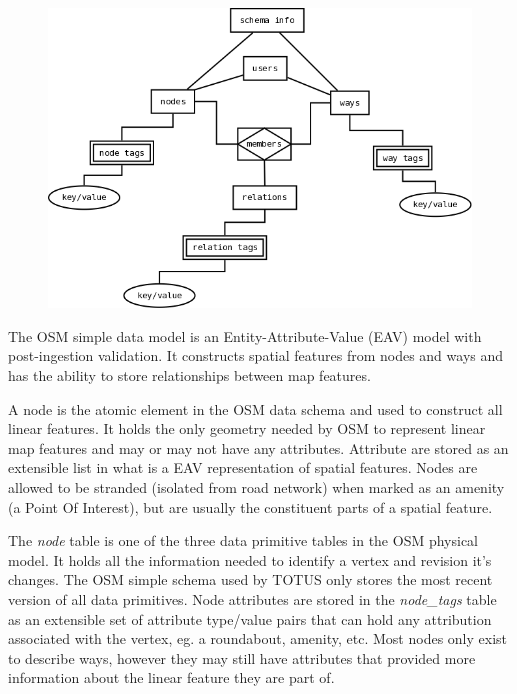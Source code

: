 \begin{figure}[h]
 \centering
 \includegraphics[scale=0.4,keepaspectratio=true]{./osm.png}
\end{figure}


The OSM simple data model is an Entity-Attribute-Value (EAV) model with
post-ingestion validation. It constructs spatial features from nodes
and ways and has the ability to store relationships between map
features.

A node is the atomic element in the OSM data schema and used to
construct all linear features. It holds the only geometry needed by OSM
to represent linear map features and may or may not have any
attributes. Attribute are stored as an extensible list in what is a EAV
representation of spatial features. Nodes are allowed to be stranded
(isolated from road network) when marked as an amenity (a Point Of
Interest), but are usually the constituent parts of a spatial feature.

The \textit{node} table is one of the three data primitive
tables in the OSM physical model. It holds all the information needed
to identify a vertex and revision it's changes. The
OSM simple schema used by TOTUS only stores the most recent version of
all data primitives. Node attributes are stored in the
\textit{node\_tags} table as an extensible set of attribute
type/value pairs that can hold any attribution associated with the
vertex, eg. a roundabout, amenity, etc. Most nodes only exist to
describe ways, however they may still have attributes that provided
more information about the linear feature they are part of.

